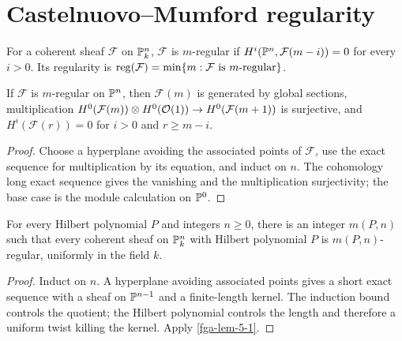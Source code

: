 \section{Castelnuovo--Mumford regularity}
\begin{definition}[regularity]\label{fga-def-5-3}\uses{}
For a coherent sheaf $\mathcal F$ on $\mathbb P^n_k$, $\mathcal F$ is $m$-regular if
$H^i(\mathbb P^n,\mathcal F(m-i))=0$ for every $i>0$.  Its regularity is
$\operatorname{reg}(\mathcal F)=\min\{m:\mathcal F\text{ is }m\text{-regular}\}$.
\end{definition}\begin{lemma}\label{fga-lem-5-1}
If $\mathcal F$ is $m$-regular on $\mathbb P^n$, then $\mathcal F(m)$ is generated by
global sections, multiplication
$H^0(\mathcal F(m))\otimes H^0(\mathcal O(1))\to H^0(\mathcal F(m+1))$ is
surjective, and $H^i(\mathcal F(r))=0$ for $i>0$ and $r\ge m-i$.
\end{lemma}
\begin{proof}
Choose a hyperplane avoiding the associated points of $\mathcal F$, use the
exact sequence for multiplication by its equation, and induct on $n$.  The
cohomology long exact sequence gives the vanishing and the multiplication
surjectivity; the base case is the module calculation on $\mathbb P^0$.
\end{proof}

\begin{theorem}\label{fga-thm-5-3}
For every Hilbert polynomial $P$ and integers $n\ge0$, there is an integer
$m(P,n)$ such that every coherent sheaf on $\mathbb P^n_k$ with Hilbert polynomial
$P$ is $m(P,n)$-regular, uniformly in the field $k$.
\end{theorem}
\begin{proof}
Induct on $n$.  A hyperplane avoiding associated points gives a short exact
sequence with a sheaf on $\mathbb P^{n-1}$ and a finite-length kernel.  The induction
bound controls the quotient; the Hilbert polynomial controls the length and
therefore a uniform twist killing the kernel.  Apply \cref{fga-lem-5-1}.
\end{proof}

